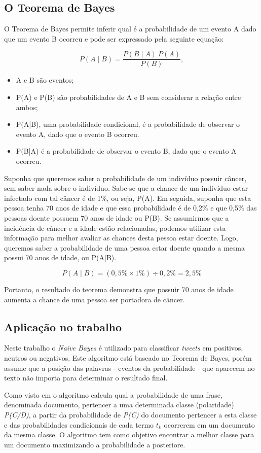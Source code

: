 \subsection{O Teorema de Bayes}

O Teorema de Bayes permite inferir qual é a probabilidade de um evento A dado que um evento B ocorreu e pode ser expressado pela seguinte equação:

$$ P(A \mid B) = \frac{P(B \mid A) \ P(A)}{P(B)}, $$

\begin{itemize}
	\item A e B são eventos;
	\item P(A) e P(B) são probabilidades de A e B sem considerar a relação entre ambos;
	\item P(A|B), uma probabilidade condicional, é a probabilidade de observar o evento A, dado que o evento B ocorreu.
	\item P(B|A) é a probabilidade de observar o evento B, dado que o evento A ocorreu.
\end{itemize}

Suponha que queremos saber a probabilidade de um indivíduo possuir câncer, sem saber nada sobre o indivíduo. Sabe-se que a chance de um indivíduo estar infectado com tal câncer é de 1\%, ou seja, P(A).
Em seguida, suponha que esta pessoa tenha 70 anos de idade e que essa probabilidade é de 0,2\% e que 0,5\% das pessoas doente possuem 70 anos de idade ou P(B). Se assumirmos que a incidência de câncer e a idade estão relacionadas, podemos utilizar esta informação para melhor avaliar as chances desta pessoa estar doente. Logo, queremos saber a probabilidade de uma pessoa estar doente quando a mesma possui 70 anos de idade, ou P(A|B).

$$ P(A \mid B) = (0,5\% \times 1\%) \div 0,2\% = 2,5\% $$

Portanto, o resultado do teorema demonstra que possuir 70 anos de idade aumenta a chance de uma pessoa ser portadora de câncer.

\subsection{Aplicação no trabalho}

Neste trabalho o \emph{Naive Bayes} é utilizado  para classificar \textit{tweets} em positivos, neutros ou negativos. Este algoritmo está baseado no Teorema de Bayes, porém assume que a posição das palavras - eventos da probabilidade - que aparecem no texto não importa para determinar o resultado final.

Como visto em \cite{lucca2013implementaccao} o algoritmo calcula qual a probabilidade de uma frase, denominada documento, pertencer a uma determinada classe (polaridade) \emph{P(C/D)}, a partir da probabilidade de \emph{P(C)} do documento pertencer a esta classe e das probabilidades condicionais de cada termo $t_{k}$ ocorrerem em um documento da mesma classe. O algoritmo tem como objetivo encontrar a melhor classe para um documento maximizando a probabilidade a posteriore. 
